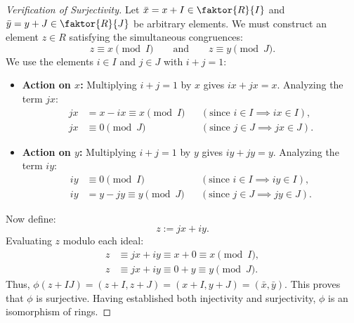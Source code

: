 \begin{proofWrapper}
\begin{content}
\begin{proof}[Verification of Surjectivity]
Let $\bar{x} = x + I \in \faktor{R}{I}$ and $\bar{y} = y + J \in \faktor{R}{J}$ be arbitrary elements. We must construct an element $z \in R$ satisfying the simultaneous congruences:
\begin{equation}\label{eq:crt-congruences-goal}
z \equiv x \pmod I \qquad \text{and} \qquad z \equiv y \pmod J.
\end{equation}
We use the elements $i \in I$ and $j \in J$ with $i + j = 1$:
\begin{itemize}
    \item \textbf{Action on $x$:} Multiplying $i + j = 1$ by $x$ gives $ix + jx = x$. Analyzing the term $jx$:
    \begin{align}
    jx &= x - ix \equiv x \pmod I && (\text{since } i \in I \implies ix \in I), \label{eq:jx-mod-I} \\
    jx &\equiv 0 \pmod J && (\text{since } j \in J \implies jx \in J). \label{eq:jx-mod-J}
    \end{align}
    \item \textbf{Action on $y$:} Multiplying $i + j = 1$ by $y$ gives $iy + jy = y$. Analyzing the term $iy$:
    \begin{align}
    iy &\equiv 0 \pmod I && (\text{since } i \in I \implies iy \in I), \label{eq:iy-mod-I} \\
    iy &= y - jy \equiv y \pmod J && (\text{since } j \in J \implies jy \in J). \label{eq:iy-mod-J}
    \end{align}
\end{itemize}
Now define:
\begin{equation}\label{eq:crt-explicit-z}
z := jx + iy.
\end{equation}
Evaluating $z$ modulo each ideal:
\begin{align*}
z &\equiv jx + iy \equiv x + 0 \equiv x \pmod I, \\
z &\equiv jx + iy \equiv 0 + y \equiv y \pmod J.
\end{align*}
Thus, $\phi(z + IJ) = (z + I, z + J) = (x + I, y + J) = (\bar{x}, \bar{y})$. This proves that $\phi$ is surjective.
Having established both injectivity and surjectivity, $\phi$ is an isomorphism of rings.
\end{proof}
\end{content}

\end{proofWrapper}

